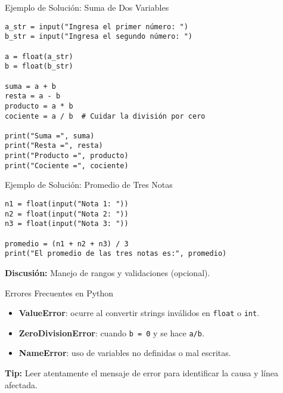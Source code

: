 \documentclass[10pt]{beamer}
\begin{document}
\begin{frame}[fragile]{Ejemplo de Solución: Suma de Dos Variables}
\begin{verbatim}
a_str = input("Ingresa el primer número: ")
b_str = input("Ingresa el segundo número: ")

a = float(a_str)
b = float(b_str)

suma = a + b
resta = a - b
producto = a * b
cociente = a / b  # Cuidar la división por cero

print("Suma =", suma)
print("Resta =", resta)
print("Producto =", producto)
print("Cociente =", cociente)
\end{verbatim}
\end{frame}

\begin{frame}[fragile]{Ejemplo de Solución: Promedio de Tres Notas}
\begin{verbatim}
n1 = float(input("Nota 1: "))
n2 = float(input("Nota 2: "))
n3 = float(input("Nota 3: "))

promedio = (n1 + n2 + n3) / 3
print("El promedio de las tres notas es:", promedio)
\end{verbatim}
\textbf{Discusión:} Manejo de rangos y validaciones (opcional).
\end{frame}

\begin{frame}{Errores Frecuentes en Python}
  \begin{itemize}
    \item \textbf{ValueError}: ocurre al convertir strings inválidos en \texttt{float} o \texttt{int}.
    \item \textbf{ZeroDivisionError}: cuando \texttt{b = 0} y se hace \texttt{a/b}.
    \item \textbf{NameError}: uso de variables no definidas o mal escritas.
  \end{itemize}
  \textbf{Tip:} Leer atentamente el mensaje de error para identificar la causa y línea afectada.
\end{frame}
\end{document}
